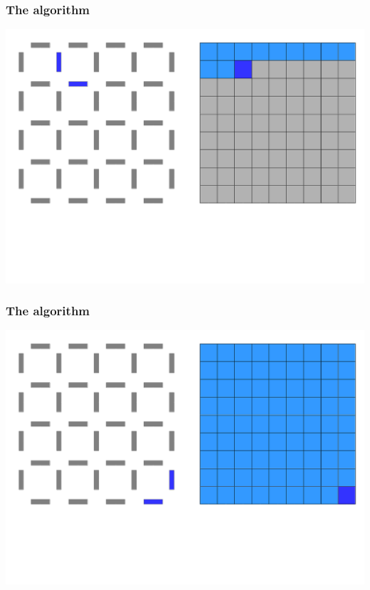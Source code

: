\documentclass{beamer}
\begin{document}
\begin{frame}
    \frametitle{The algorithm}
    \begin{center}
        \includegraphics[width=.8\textwidth]{img/grid4.png}
    \end{center}
\end{frame}

\begin{frame}
    \frametitle{The algorithm}
    \begin{center}
        \includegraphics[width=.8\textwidth]{img/grid8.png}
    \end{center}
\end{frame}
\end{document}
